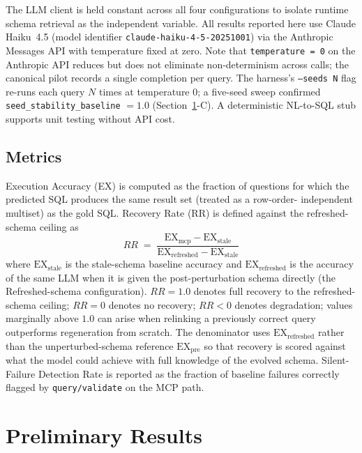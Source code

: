 \documentclass[conference,10pt,a4paper]{IEEEtran}
\begin{document}
The LLM client is held constant across all four configurations to isolate
runtime schema retrieval as the independent variable. All results
reported here use Claude Haiku~4.5 (model identifier
\texttt{claude-haiku-4-5-20251001}) via the Anthropic Messages API with
temperature fixed at zero. Note that \texttt{temperature = 0} on the
Anthropic API reduces but does not eliminate non-determinism across
calls; the canonical pilot records a single completion per query. The
harness's \texttt{--seeds N} flag re-runs each query $N$ times at
temperature $0$; a five-seed sweep confirmed
\texttt{seed\_stability\_baseline} $= 1.0$
(Section~\ref{sec:results}-C). A deterministic NL-to-SQL stub
supports unit testing without API cost.

\subsection{Metrics}
Execution Accuracy (EX) is computed as the fraction of questions for which
the predicted SQL produces the same result set (treated as a row-order-
independent multiset) as the gold SQL. Recovery Rate (RR) is defined
against the refreshed-schema ceiling as
\begin{equation}
RR \;=\; \frac{\text{EX}_{\text{mcp}} - \text{EX}_{\text{stale}}}
              {\text{EX}_{\text{refreshed}} - \text{EX}_{\text{stale}}}
\label{eq:rr}
\end{equation}
where $\text{EX}_{\text{stale}}$ is the stale-schema baseline accuracy and
$\text{EX}_{\text{refreshed}}$ is the accuracy of the same LLM when it is
given the post-perturbation schema directly (the Refreshed-schema
configuration). $RR = 1.0$ denotes full recovery to the refreshed-schema
ceiling; $RR = 0$ denotes no recovery; $RR < 0$ denotes degradation; values
marginally above $1.0$ can arise when relinking a previously correct query
outperforms regeneration from scratch. The denominator uses
$\text{EX}_{\text{refreshed}}$ rather than the unperturbed-schema reference
$\text{EX}_{\text{pre}}$ so that recovery is scored against what the model
could achieve with full knowledge of the evolved schema. Silent-Failure
Detection Rate is reported as the fraction of baseline failures correctly
flagged by \texttt{query/validate} on the MCP path.

\section{Preliminary Results}
\label{sec:results}
\end{document}
